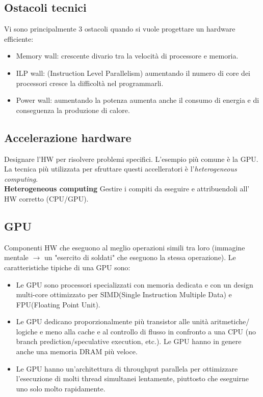 \documentclass[8pt,a4paper]{article}
\begin{document}
\begin{multicols}{5}
    \subsection{Ostacoli tecnici}
    Vi sono principalmente 3 ostacoli quando si vuole progettare un hardware efficiente:
    \begin{itemize}
      \item Memory wall: crescente divario tra la velocità di processore e memoria.
      \item ILP wall: (Instruction Level Parallelism) aumentando il numero di core dei 
      processori cresce la difficoltà nel programmarli.
      \item Power wall: aumentando la potenza aumenta anche il consumo di energia e
      di conseguenza la produzione di calore.
    \end{itemize}

    \subsection{Accelerazione hardware}
    Designare l'HW per risolvere problemi specifici. L'esempio più comune è la GPU. 
    La tecnica più utilizzata per sfruttare questi accelleratori è l'\textit{heterogeneous 
    computing}.\\
    \textbf{Heterogeneous computing} Gestire i compiti da eseguire e attribuendoli all'
    HW corretto (CPU/GPU).

    \subsection{GPU}
    Componenti HW che eseguono al meglio operazioni simili tra loro (immagine mentale
    $\rightarrow$ un "esercito di soldati" che eseguono la stessa operazione). Le 
    caratteristiche tipiche di una GPU sono:
    \begin{itemize}
      \item Le GPU sono processori specializzati con memoria dedicata e con un design 
      multi-core ottimizzato per SIMD(Single Instruction Multiple Data) e FPU(Floating
      Point Unit).
      \item Le GPU dedicano proporzionalmente più transistor alle unità aritmetiche/
      logiche e meno alla cache e al controllo di flusso in confronto a una CPU 
      (no branch prediction/speculative execution, etc.). Le GPU hanno 
      in genere anche una memoria DRAM più veloce.
      \item Le GPU hanno un'architettura di throughput parallela per ottimizzare 
      l'esecuzione di molti thread simultanei lentamente, piuttosto che eseguirne uno 
      solo molto rapidamente.
    \end{itemize}

\end{multicols}
\end{document}
